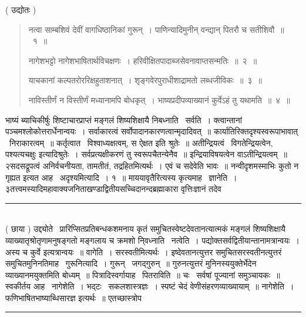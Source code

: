 \documentclass[11pt, openany]{book}
\begin{document}
\begin{center}
 ( उद्योतः ) 
\end{center}

\begin{quote}
{\mbh नत्वा साम्बशिवं देवीं वागधिष्ठानिकां गुरून्~। पाणिन्यादिमुनीन् वन्द्यान् पितरौ च सतीशिवौ~॥~१~॥

नागेशभट्टो नागेशभाषितार्थविचक्षणः~। हरिवीक्षितपादाब्जसेवनावाप्तसन्मतिः~॥~२~॥

याचकानां कल्पतरोररिक्षहुताशनात्~। शृङ्गवेरपुराधीशाद्रामतो लब्धजीविकः~॥~३~॥

नाविस्तीर्णं न विस्तीर्णं मध्यानामपि बोधकृत्~। भाष्यप्रदीपव्याख्यानं कुर्वेऽहं तु यथामति~॥~४~॥}
\end{quote}

भाष्यं ब्याचिकीर्षुः शिष्टाचारप्राप्तं मङ्गलं शिष्यशिक्षायै निबध्नाति \textendash\ सर्वति~। क्त्वान्तानां पञ्चमश्लोकोत्तरार्धेनान्वयः~। सर्वाकारत्वं सर्वोपादानकारणत्वान्मृदादिवत्~॥ कार्यातिरिक्तदृश्यस्वरूपाभावात् \textendash\ निराकारत्वम्~॥ कर्तृत्वात \textendash\ विश्वाध्यक्षत्वम्, {\qt स ऐक्षत} इति श्रुतेः~॥ अतीन्द्रियत्वं \textendash\ विगतेन्द्रियत्वेन, {\qt पश्यत्यचक्षुः} इत्यादिश्रुतेः~। सर्वप्रत्यक्षीकरणं तु स्वरूपचैतन्येनैव~॥ इन्द्रियाविषयत्वेन वाऽतीन्द्रियत्वम्~॥ २सदसद्रूपत्वं अनिर्वचनीयता, तामतीतं, तद्रहितमित्यर्थः~। एवं च सदेवेति भावः~॥ नन्वीदृशमस्माभिः कुतो न गृह्यत इत्यत आह \textendash\ अदृश्यमित्यादि~। १~॥ माययावृतैरित्यस्य कृत्यमाह \textendash\ ज्ञानेति~। ३तत्त्वमस्यादिमहावाक्यजनिताखण्डाद्वितीयसच्चिदानन्दब्रह्माकारा वृत्तिःज्ञानं तदेव

\noindent
\rule{1\linewidth}{0.5pt}\\

 ( छाया ) उद्द्योते \textendash\ प्रारिप्सितप्रतिबन्धकशमनाय कृतं समुचितस्वेष्टदेवतानत्यात्मकं मङ्गलं शिष्यशिक्षायै व्याख्यातृश्रोतृणामनुषङ्गतो मङ्गलाय च क्रमशो नि्वध्नाति \textendash\ नत्वेति~। पद्योक्तसर्वद्वितीयान्तानामत्रान्वयः~। अस्य च {\qt कुर्वे} इत्यत्रान्वयः~॥ वागेति~। सरस्वतीमित्यर्थः~। इष्देवतानत्युत्तर समुचितसरस्वतीनत्युत्तरं समुचितमुनिनतिमाह \textendash\ गुरूनित्यादि~। गुरून् \textendash\ जगद्गुरुन्~॥ गुरुनत्युत्तरं मुनिनस्ययुक्तेर्भेदेन व्याख्यानमयुक्तमिति बोध्यम्~॥ पित्रादिस्वर्गायाह \textendash\ पितराविति~॥ चः \textendash\ सर्वषां पूज्यानां समुञ्चायकः~॥ स्वकीर्तय आह \textendash\ नागेशेति~। भद्टः \textendash\ सकलशास्त्रज्ञः~। स्पष्टं चेदं वेणीसंहरणव्याख्यायाम्~॥ नागेशेति~। फणिभाषितभाष्याब्धिसारज्ञ इत्यर्थः~॥ एतच्छास्त्रोप \textendash\

\noindent
\rule{1\linewidth}{0.5pt}\\
\end{document}
